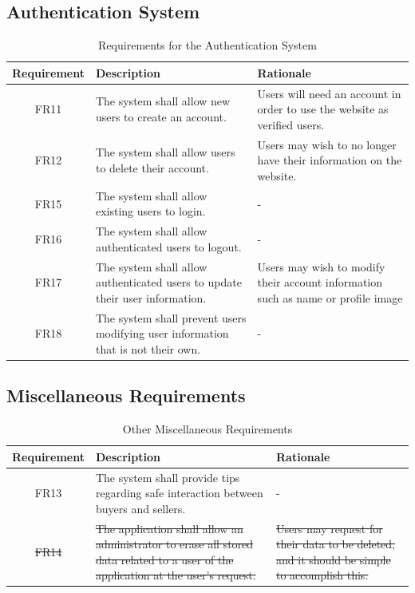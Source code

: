 \documentclass[fullpage]{article}
\begin{document}
\subsection{Authentication System}
\begin{table}[h!]
\flushleft
\begin{tabular}{|c|p{6cm}|p{6cm}|}
\hline
 \rowcolor{lightgray} 
\textbf{Requirement} & \textbf{Description} & \textbf{Rationale} \\
\hline
FR11 &The system shall allow new users to create an account.& Users will need an account in order to use the website as verified users.\\
\hline
FR12&The system shall allow users to delete their account. & Users may wish to no longer have their information on the website.\\
\hline
FR15 &The system shall allow existing users to login.& -\\
\hline
FR16 &The system shall allow authenticated users to logout.& -\\
\hline
FR17 &The system shall allow authenticated users to update their user information.& Users may wish to modify their account information such as name or profile image\\
\hline
FR18 &The system shall prevent users modifying user information that is not their own.& -\\
\hline
\end{tabular}
\caption{Requirements for the Authentication System}
\end{table}

\subsection{Miscellaneous Requirements}
\begin{table}[h!]
\flushleft
\begin{tabular}{|c|p{6cm}|p{6cm}|}
\hline
 \rowcolor{lightgray} 
\textbf{Requirement} & \textbf{Description} & \textbf{Rationale} \\
\hline
FR13 & The system shall provide tips regarding safe interaction between buyers and sellers. & -\\
\hline

\sout{FR14}& \sout{The application shall allow an administrator to erase all stored data related to a user of the application at the user's request.} & \sout{Users may request for their data to be deleted, and it should be simple to accomplish this.}\\
\hline

\end{tabular}
\caption{Other Miscellaneous Requirements}
\end{table}
\end{document}
